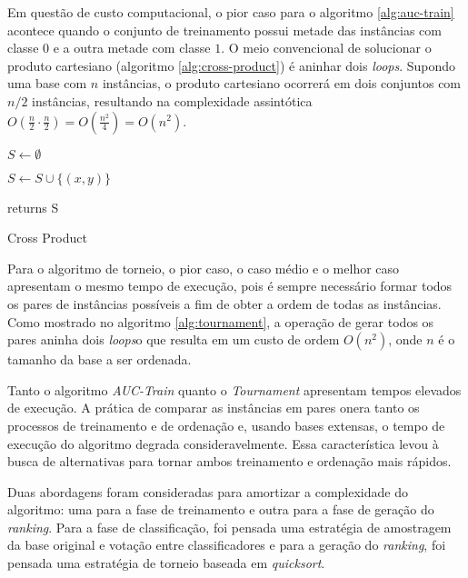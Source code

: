 Em questão de custo computacional, o pior caso para o algoritmo \ref{alg:auc-train} acontece quando o conjunto de treinamento possui metade das instâncias com classe $0$ e a outra metade com classe $1$. O meio convencional de solucionar o produto cartesiano (algoritmo \ref{alg:cross-product}) é aninhar dois \emph{loops}. Supondo uma base com $n$ instâncias, o produto cartesiano ocorrerá em dois conjuntos com $n/2$ instâncias, resultando na complexidade assintótica $O(\frac{n}{2} \cdot \frac{n}{2}) = O(\frac{n^2}{4}) = O(n^2)$.

\begin{algorithm}
    \begin{algorithmic}
        \STATE $S \gets \emptyset$

                \STATE $S \gets S \cup \{(x, y)\}$
            \ENDFOR
        \ENDFOR

        \STATE returns S

        \caption{Cross Product}
        \label{alg:cross-product}

    \end{algorithmic}
\end{algorithm}

Para o algoritmo de torneio, o pior caso, o caso médio e o melhor caso apresentam o mesmo tempo de execução, pois é sempre necessário formar todos os pares de instâncias possíveis a fim de obter a ordem de todas as instâncias. Como mostrado no algoritmo \ref{alg:tournament}, a operação de gerar todos os pares aninha dois \emph{loops}o que resulta em um custo de ordem $O(n^2)$, onde $n$ é o tamanho da base a ser ordenada.

Tanto o algoritmo \emph{AUC-Train} quanto o \emph{Tournament} apresentam tempos elevados de execução. A prática de comparar as instâncias em pares onera tanto os processos de treinamento e de ordenação e, usando bases extensas, o tempo de execução do algoritmo degrada consideravelmente. Essa característica levou à busca de alternativas para tornar ambos treinamento e ordenação mais rápidos.

Duas abordagens foram consideradas para amortizar a complexidade do algoritmo: uma para a fase de treinamento e outra para a fase de geração do \emph{ranking}. Para a fase de classificação, foi pensada uma estratégia de amostragem da base original e votação entre classificadores e para a geração do \emph{ranking}, foi pensada uma estratégia de torneio baseada em \emph{quicksort}.

